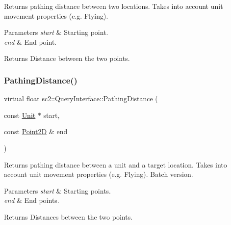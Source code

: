 Returns pathing distance between two locations. Takes into account unit movement properties (e.\+g. Flying). 
\begin{DoxyParams}{Parameters}
{\em start} & Starting point. \\
\hline
{\em end} & End point. \\
\hline
\end{DoxyParams}
\begin{DoxyReturn}{Returns}
Distance between the two points. 
\end{DoxyReturn}
\mbox{\label{classsc2_1_1_query_interface_a757adb07f0f93e4b289ecf3ea0c4358b}} 
\subsubsection{\texorpdfstring{Pathing\+Distance()}{PathingDistance()}\hspace{0.1cm}{\footnotesize\ttfamily [2/2]}}
{\footnotesize\ttfamily virtual float sc2\+::\+Query\+Interface\+::\+Pathing\+Distance (\begin{DoxyParamCaption}\item[{const \hyperlink{classsc2_1_1_unit}{Unit} $\ast$}]{start,  }\item[{const \hyperlink{structsc2_1_1_point2_d}{Point2D} \&}]{end }\end{DoxyParamCaption})\hspace{0.3cm}{\ttfamily [pure virtual]}}

Returns pathing distance between a unit and a target location. Takes into account unit movement properties (e.\+g. Flying). Batch version. 
\begin{DoxyParams}{Parameters}
{\em start} & Starting points. \\
\hline
{\em end} & End points. \\
\hline
\end{DoxyParams}
\begin{DoxyReturn}{Returns}
Distances between the two points. 
\end{DoxyReturn}
\mbox{\label{classsc2_1_1_query_interface_aa5ee0fbda6e0eac6f096710328484d2a}} 
